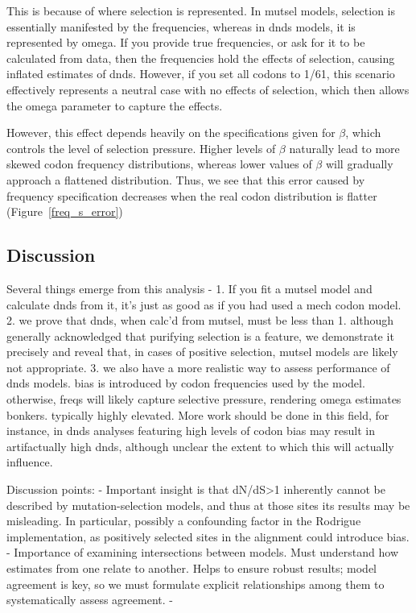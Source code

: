 \documentclass[11pt]{article}
\begin{document}
This is because of where selection is represented. In mutsel models, selection is essentially manifested by the frequencies, whereas in dnds models, it is represented by omega. If you provide true frequencies, or ask for it to be calculated from data, then the frequencies hold the effects of selection, causing inflated estimates of dnds. However, if you set all codons to 1/61, this scenario effectively represents a neutral case with no effects of selection, which then allows the omega parameter to capture the effects.

However, this effect depends heavily on the specifications given for $\beta$, which controls the level of selection pressure. Higher levels of $\beta$ naturally lead to more skewed codon frequency distributions, whereas lower values of $\beta$ will gradually approach a flattened distribution. Thus, we see that this error caused by frequency specification decreases when the real codon distribution is flatter (Figure~\ref{freq_s_error})






\subsection*{Discussion}
	
 Several things emerge from this analysis - 
1. If you fit a mutsel model and calculate dnds from it, it's just as good as if you had used a mech codon model. 
2. we prove that dnds, when calc'd from mutsel, must be less than 1. although generally acknowledged that purifying selection is a feature, we demonstrate it precisely and reveal that, in cases of positive selection, mutsel models are likely not appropriate.
3. we also have a more realistic way to assess performance of dnds models. bias is introduced by codon frequencies used by the model. otherwise, freqs will likely capture selective pressure, rendering omega estimates bonkers. typically highly elevated. More work should be done in this field, for instance, in dnds analyses featuring high levels of codon bias may result in artifactually high dnds, although unclear the extent to which this will actually influence.

Discussion points:
- Important insight is that dN/dS>1 inherently cannot be described by mutation-selection models, and thus at those sites its results may be misleading. In particular, possibly a confounding factor in the Rodrigue implementation, as positively selected sites in the alignment could introduce bias.
- Importance of examining intersections between models. Must understand how estimates from one relate to another. Helps to ensure robust results; model agreement is key, so we must formulate explicit relationships among them to systematically assess agreement.
- 
\end{document}
